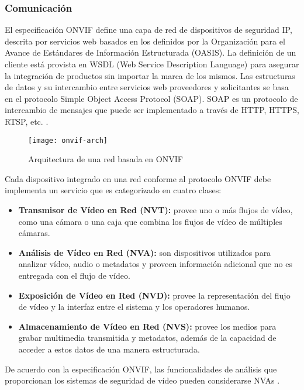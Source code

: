 \subsubsection{Comunicación}
El especificación ONVIF define una capa de red de dispositivos de seguridad IP, descrita por servicios web basados en los definidos por la Organización para el Avance de Estándares de Información Estructurada (OASIS). La definición de un cliente está provista en WSDL (Web Service Description Language) para asegurar la integración de productos sin importar la marca de los mismos. Las estructuras de datos y su intercambio entre servicios web proveedores y solicitantes se basa en el protocolo Simple Object Access Protocol (SOAP). SOAP es un protocolo de intercambio de mensajes que puede ser implementado a través de HTTP, HTTPS, RTSP, etc. \parencite{Onvif2016-dc}.

    \begin{figure}[H]
        \centering
        \texttt{[image: onvif-arch]}
        \caption{Arquitectura de una red basada en ONVIF \parencite{Senst2011-bb}}
        \label{fig:onvif-arch}
    \end{figure}
    
Cada dispositivo integrado en una red conforme al protocolo ONVIF debe implementa un servicio que es categorizado en cuatro clases:

\begin{itemize}
\item \textbf{Transmisor de Vídeo en Red (NVT):} provee uno o más flujos de vídeo, como una cámara o una caja que combina los flujos de vídeo de múltiples cámaras.
\item \textbf{Análisis de Vídeo en Red (NVA):} son dispositivos utilizados para analizar vídeo, audio o metadatos y proveen información adicional que no es entregada con el flujo de vídeo. 
\item \textbf{Exposición de Vídeo en Red (NVD): }provee la representación del flujo de vídeo y la interfaz entre el sistema y los operadores humanos.
\item \textbf{Almacenamiento de Vídeo en Red (NVS):} provee los medios para grabar multimedia transmitida y metadatos, además de la capacidad de acceder a estos datos de una manera estructurada.
\end{itemize}

De acuerdo con la especificación ONVIF, las funcionalidades de análisis que proporcionan los sistemas de seguridad de vídeo pueden considerarse NVAs \parencite{Senst2011-bb}.

